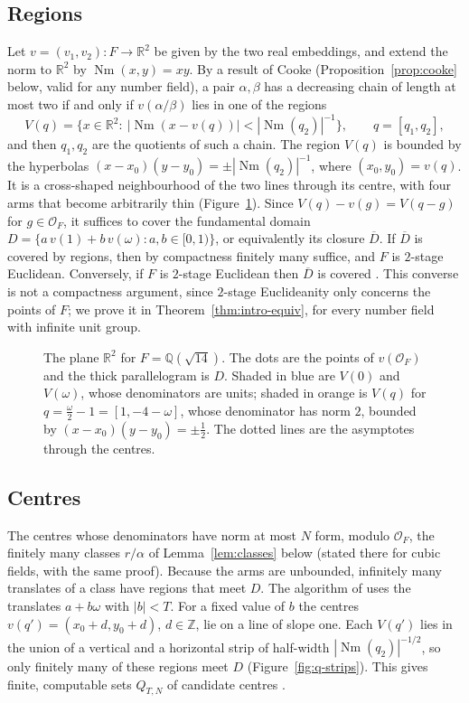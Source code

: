 \documentclass[11pt]{amsart}
\theoremstyle{definition}
\theoremstyle{remark}
\numberwithin{equation}{section}
\newcommand{\Q}{\mathbb{Q}}
\newcommand{\Z}{\mathbb{Z}}
\newcommand{\R}{\mathbb{R}}
\newcommand{\cO}{\mathcal{O}}
\newcommand{\Nm}{\operatorname{Nm}}
\begin{document}
\subsection{Regions} Let $v=(v_1,v_2)\colon F\to\R^2$ be given by the two real embeddings,
and extend the norm to $\R^2$ by $\Nm(x,y)=xy$. By a result of Cooke
(Proposition~\ref{prop:cooke} below, valid for any number field), a pair $\alpha,\beta$ has a
decreasing chain of length at most two if and only if $v(\alpha/\beta)$ lies in one of the
regions
\[
  V(q)=\bigl\{x\in\R^2:\ |\Nm(x-v(q))|<|\Nm(q_2)|^{-1}\bigr\},\qquad q=[q_1,q_2],
\]
and then $q_1,q_2$ are the quotients of such a chain. The region $V(q)$ is bounded by the
hyperbolas $(x-x_0)(y-y_0)=\pm|\Nm(q_2)|^{-1}$, where $(x_0,y_0)=v(q)$. It is a cross-shaped
neighbourhood of the two lines through its centre, with four arms that become arbitrarily thin
(Figure~\ref{fig:q-regions}). Since $V(q)-v(g)=V(q-g)$ for $g\in\cO_F$, it suffices to cover
the fundamental domain $D=\{a\,v(1)+b\,v(\omega):a,b\in[0,1)\}$, or equivalently its closure
$\overline D$. If $\overline D$ is covered by regions, then by compactness finitely many
suffice, and $F$ is $2$-stage Euclidean. Conversely, if $F$ is $2$-stage Euclidean then
$\overline D$ is covered \cite[Proposition~2.2]{GM}. This converse is not a compactness
argument, since $2$-stage Euclideanity only concerns the points of $F$; we prove it in
Theorem~\ref{thm:intro-equiv}, for every number field with infinite unit group.

\begin{figure}[ht]
\centering

\caption{The plane $\R^2$ for $F=\Q(\sqrt{14})$. The dots are the points of $v(\cO_F)$ and the
thick parallelogram is $D$. Shaded in blue are $V(0)$ and $V(\omega)$, whose denominators are
units; shaded in orange is $V(q)$ for $q=\frac{\omega}{2}-1=[1,-4-\omega]$, whose denominator has
norm $2$, bounded by $(x-x_0)(y-y_0)=\pm\frac12$. The dotted lines are the asymptotes through the
centres.}
\label{fig:q-regions}
\end{figure}

\subsection{Centres} The centres whose denominators have norm at most $N$ form, modulo
$\cO_F$, the finitely many classes $r/\alpha$ of Lemma~\ref{lem:classes} below (stated there for
cubic fields, with the same proof). Because the arms are unbounded, infinitely many translates of
a class have regions that meet $D$. The algorithm of \cite{GM} uses the translates $a+b\omega$
with $|b|<T$. For a fixed value of $b$ the centres $v(q')=(x_0+d,y_0+d)$, $d\in\Z$, lie on a
line of slope one. Each $V(q')$ lies in the union of a vertical and a horizontal strip of
half-width $|\Nm(q_2)|^{-1/2}$, so only finitely many of these regions meet $D$
(Figure~\ref{fig:q-strips}). This gives finite, computable sets $Q_{T,N}$ of candidate
centres \cite[Proposition~3.1]{GM}.
\end{document}
